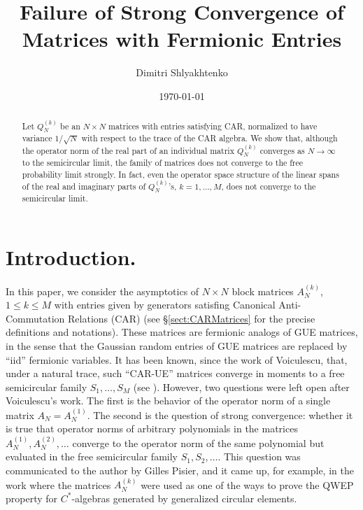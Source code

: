\documentclass[11pt]{article}
\title{Failure of Strong Convergence of Matrices with Fermionic Entries}
\author{Dimitri Shlyakhtenko}
\date{\today}
\begin{document}
\maketitle
\begin{abstract}
    Let $Q^{(k)}_N$ be an $N\times N$ matrices with entries satisfying CAR, normalized to have variance $1/\sqrt{N}$ with respect to the trace of the CAR algebra. We show that, although the operator norm of the real part of an individual matrix $Q^{(k)}_N$ converges as $N\to\infty$ to the semicircular limit, the family of matrices does not converge to the free probability limit strongly. In fact, even the operator space structure of the linear spans of the real and imaginary parts of $Q^{(k)}_N$'s, $k=1,\dots,M$, does not converge to the semicircular limit. 
\end{abstract}
\section{Introduction.}
In this paper, we consider the asymptotics of $N\times N$ block matrices $A^{(k)}_N$, $1\leq k\leq M$ with entries given by generators satisfing Canonical Anti-Commutation Relations (CAR) (see \S\ref{sect:CARMatrices} for the precise definitions and notations).  These matrices are fermionic analogs of GUE matrices, in the sense that the Gaussian random entries of GUE matrices are replaced by ``iid'' fermionic variables.  It has been known, since the work of Voiculescu, that, under a natural trace, such ``CAR-UE'' matrices converge in moments to a free semicircular family $S_1,\dots,S_M$ (see \cite{Voiculescu:Random}).  However, two questions were left open after Voiculescu's work. The first is the behavior of the operator norm of a single matrix $A_N=A_N^{(1)}$.  The second is the question of strong convergence: whether it is true that operator norms of arbitrary polynomials in the matrices $A_N^{(1)},A_N^{(2)},\dots$ converge to the operator norm of the same polynomial but evaluated in the free semicircular family $S_1,S_2,\dots$.  This question was communicated to the author by Gilles Pisier, and it came up, for example, in the work \cite{Pisier-Shlyakhtenko:Grothendieck} where the matrices $A_N^{(k)}$ were used as one of the ways to prove the QWEP property for $C^*$-algebras generated by generalized circular elements. 
\end{document}
